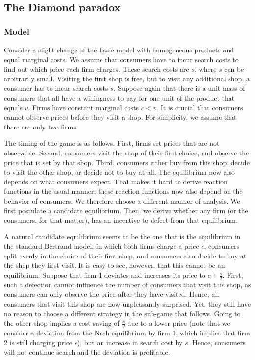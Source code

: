 \subsection{The Diamond paradox}
\subsubsection{Model}
Consider a slight change of the basic model with homogeneous products and equal
marginal costs. We assume that consumers have to incur search costs to
find out which price each firm charges. These search costs are $s$,
where $s$ can be arbitrarily small. Visiting the first shop is free,
but to visit any additional shop, a consumer has to incur search costs
$s$. Suppose again that there is a unit mass of consumers that all have
a willingness to pay for one unit of the product that equals $v$. Firms
have constant marginal costs $c < v$. It is crucial that consumers
cannot observe prices before they visit a shop. For simplicity, we assume
that there are only two firms.

The timing of the game is as follows. First, firms set prices that are
not observable. Second, consumers visit the shop of their first choice,
and observe the price that is set by that shop. Third, consumers either
buy from this shop, decide to visit the other shop, or decide not to buy
at all. The equilibrium now also depends on what consumers expect. That
makes it hard to derive reaction functions in the usual manner; these
reaction functions now also depend on the behavior of consumers. We
therefore choose a different manner of analysis. We first postulate a
candidate equilibrium. Then, we derive whether any firm (or the
consumers, for that matter), has an incentive to defect from that
equilibrium.

A natural candidate equilibrium seems to be the one that is the
equilibrium in the standard Bertrand model, in which both firms charge a
price $c$, consumers split evenly in the choice of their first shop,
and consumers also decide to buy at the shop they first visit. It is easy
to see, however, that this cannot be an equilibrium. Suppose that firm 1
deviates and increases its price to $c + \frac{s}{2}$. First, such a
defection cannot influence the number of consumers that visit this shop,
as consumers can only observe the price after they have visited. Hence,
all consumers that visit this shop are now unpleasantly surprised. Yet,
they still have no reason to choose a different strategy in the sub-game
that follows. Going to the other shop implies a cost-saving of
$\frac{s}{2}$ due to a lower price (note that we consider a deviation
from the Nash equilibrium by firm 1, which implies that firm 2 is still
charging price $c$), but an increase in search cost by $s$. Hence,
consumers will not continue search and the deviation is profitable.

